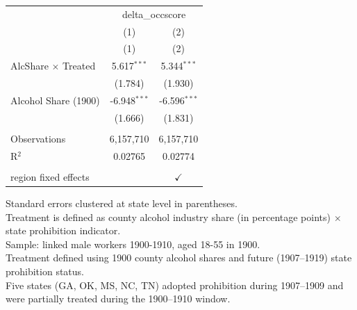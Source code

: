 
\begingroup
\centering
\begin{tabular}{lcc}
   \toprule
    & \multicolumn{2}{c}{delta\_occscore}\\
                              & (1)            & (2) \\   
                              & (1)            & (2)\\  
   \midrule 
   AlcShare $\times$ Treated  & 5.617$^{***}$  & 5.344$^{***}$\\
                              & (1.784)        & (1.930)\\
   Alcohol Share (1900)       & -6.948$^{***}$ & -6.596$^{***}$\\
                              & (1.666)        & (1.831)\\   
    \\
   Observations               & 6,157,710      & 6,157,710\\  
   R$^2$                      & 0.02765        & 0.02774\\  
    \\
   region fixed effects       &                & $\checkmark$\\   
   \bottomrule
\end{tabular}
 
\par \raggedright 
Standard errors clustered at state level in parentheses.\\
Treatment is defined as county alcohol industry share (in percentage points) $\times$ state prohibition indicator.\\
Sample: linked male workers 1900-1910, aged 18-55 in 1900.\\
Treatment defined using 1900 county alcohol shares and future (1907--1919) state prohibition status.\\
Five states (GA, OK, MS, NC, TN) adopted prohibition during 1907--1909 and were partially treated during the 1900--1910 window.
\par\endgroup


